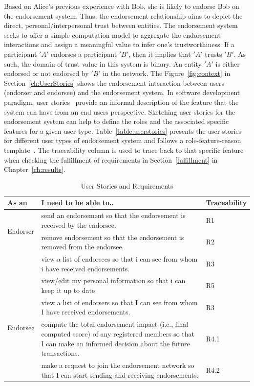 Based on Alice's previous experience with Bob, she is likely to endorse Bob on
the endorsement system. Thus, the endorsement relationship aims to depict the
direct, personal/interpersonal trust between entities. The endorsement system
seeks to offer a simple computation model to aggregate the endorsement
interactions and assign a meaningful value to infer one's trustworthiness. If a
participant $'A'$ endorses a participant $'B'$, then it implies that $'A'$
trusts $'B'$. As such, the domain of trust value in this system is binary. An
entity $'A'$ is either endorsed or not endorsed by $'B'$ in the network. The
Figure~\ref{fig:context} in Section~\ref{ch:UserStories} shows the endorsement
interaction between users (endorser and endorsee) and the endorsement system.
In software development paradigm, user stories~\cite{cohn2004user} provide an
informal description of the feature that the system can have from an end users
perspective. Sketching user stories for the endorsement system can help to
define the roles and the associated specific features for a given user type.
Table~\ref{table:userstories} presents the user stories for different user
types of endorsement system and follows a role-feature-reason
template~\cite{agile1}. The traceability column is used to trace back to that
specific feature when checking the fulfillment of requirements in
Section~\ref{fulfillment} in Chapter~\ref{ch:results}.
\begin{center} \label{table:userstories} 
	\begin{table}
	\begin{tabular} {| l | p{8cm} | l |}
		\hline
		\textbf{As an}  & \textbf{I need to be able to..}   & \textbf{Traceability} \\
		\hline
		\multirow{2}{*}{Endorser} & send an endorsement so that the endorsement
		is received by the endorsee.& R1
		\\\cline{2-3} 
		& remove endorsement so that the endorsement is removed from the
		endorsee.  & R2 \\\cline{2-3}
		& view a list of endorsees so that i can see from whom i have received 
		endorsements.& R3 \\\cline{2-3}
		& view/edit my personal information so that i can keep it up to
		date& R5 \\\cline{2-3}
		\hline
		\multirow{2}{*}{Endorsee} & view a list of endorsers so that I can see
		from whom I have received endorsements.& R3 \\\cline{2-3}
		\hline
		\multirow{2}{*}{other users} & compute the total endorsement
		impact (i.e., final computed score) of any registered members so that I
		can make an informed decision about the future transactions.
		& R4.1 \\\cline{2-3}
		& make a request to join the endorsement network so that I can start
		sending and receiving endorsements.  
		& R4.2 \\\cline{2-3}
		\hline
	\end{tabular}
	\caption{User Stories and Requirements}
\end{table}
\end{center}
